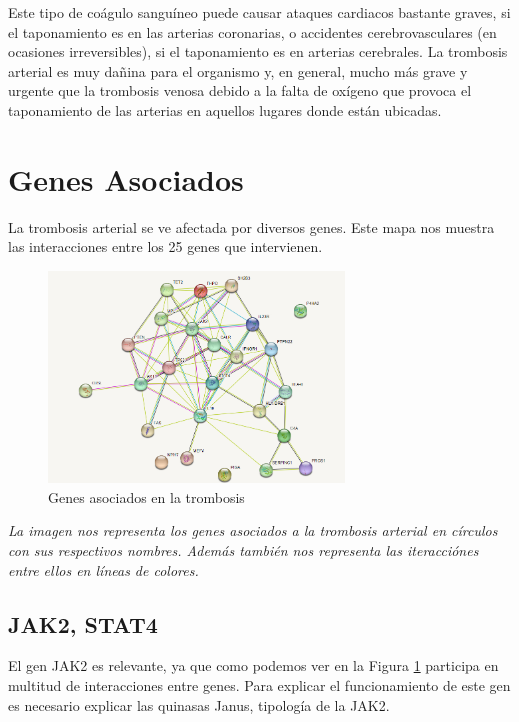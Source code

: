 Este tipo de coágulo sanguíneo puede causar ataques cardiacos bastante graves, si el taponamiento es en las arterias coronarias, o accidentes cerebrovasculares (en ocasiones irreversibles), si el taponamiento es en arterias cerebrales. La trombosis arterial es muy dañina para el organismo y, en general, mucho más grave y urgente que la trombosis venosa debido a la falta de oxígeno que provoca el taponamiento de las arterias en aquellos lugares donde están ubicadas. 
	
\section{Genes Asociados}
		La trombosis arterial se ve afectada por diversos genes. Este mapa nos muestra las interacciones entre los 25 genes que intervienen.
		
    \begin{figure}[h]
        \centering
    	\includegraphics[width=0.70\textwidth]{figures/genes_asociados.png}
    	\caption{Genes asociados en la trombosis}
    	\label{fig: Figura 2}
      \end{figure}
    \textit{La imagen nos representa los genes asociados a la trombosis arterial en círculos con sus respectivos nombres. Además también nos representa las iteracciónes entre ellos en líneas de colores.}
\subsection{\textbf {JAK2, STAT4}}

          El gen JAK2 es relevante, ya que como podemos ver en la Figura \ref{fig: Figura 2}  participa en multitud de interacciones entre genes. Para explicar el funcionamiento de este gen es necesario explicar las quinasas Janus, tipología de la JAK2.\\
		
